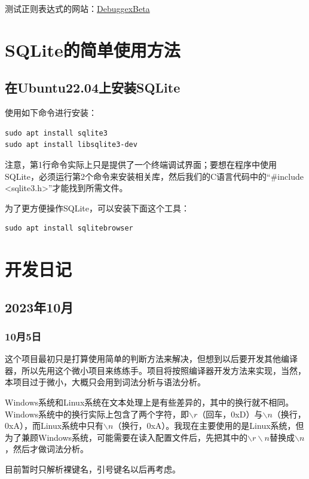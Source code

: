 测试正则表达式的网站：\href{https://www.debuggex.com/?flavor=pcre#cheatsheet}{DebuggexBeta}


\chapter{SQLite的简单使用方法}


\section{在Ubuntu22.04上安装SQLite}
使用如下命令进行安装：
\begin{verbatim}
sudo apt install sqlite3
sudo apt install libsqlite3-dev
\end{verbatim}

注意，第1行命令实际上只是提供了一个终端调试界面；要想在程序中使用SQLite，必须运行第2个命令来安装相关库，然后我们的C语言代码中的“\#include <sqlite3.h>”才能找到所需文件。

为了更方便操作SQLite，可以安装下面这个工具：
\begin{verbatim}
sudo apt install sqlitebrowser
\end{verbatim}


\chapter{开发日记}


\section{2023年10月}


\subsection{10月5日}
这个项目最初只是打算使用简单的判断方法来解决，但想到以后要开发其他编译器，所以先用这个微小项目来练练手。项目将按照编译器开发方法来实现，当然，本项目过于微小，大概只会用到词法分析与语法分析。

Windows系统和Linux系统在文本处理上是有些差异的，其中的换行就不相同。Windows系统中的换行实际上包含了两个字符，即$\backslash r$（回车，0xD）与$\backslash n$（换行，0xA），而Linux系统中只有$\backslash n$（换行，0xA）。我现在主要使用的是Linux系统，但为了兼顾Windows系统，可能需要在读入配置文件后，先把其中的$\backslash r\backslash n$替换成$\backslash n$，然后才做词法分析。

目前暂时只解析裸键名，引号键名以后再考虑。


